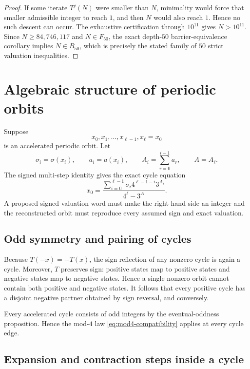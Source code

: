 \documentclass[11pt]{article}
\theoremstyle{definition}
\theoremstyle{remark}
\begin{document}
\begin{proof}
If some iterate $T^j(N)$ were smaller than $N$, minimality would force that smaller admissible integer to reach $1$, and then $N$ would also reach $1$.  Hence no such descent can occur.  The exhaustive certification through $10^{11}$ gives $N>10^{11}$.  Since $N\ge84{,}746{,}117$ and $N\in F_{50}$, the exact depth-$50$ barrier-equivalence corollary implies $N\in B_{50}$, which is precisely the stated family of $50$ strict valuation inequalities.
\end{proof}

\section{Algebraic structure of periodic orbits}

Suppose
\[
x_0,x_1,\ldots,x_{\ell-1},x_\ell=x_0
\]
is an accelerated periodic orbit.  Let
\[
\sigma_i=\sigma(x_i),
\qquad
a_i=a(x_i),
\qquad
A_i=\sum_{r=0}^{i-1}a_r,
\qquad
A=A_\ell.
\]
The signed multi-step identity gives the exact cycle equation
\begin{equation}
x_0
=
\frac{\displaystyle
\sum_{i=0}^{\ell-1}
\sigma_i4^{\ell-1-i}3^{A_i}}
{4^\ell-3^A}.
\label{eq:cycle-equation}
\end{equation}
A proposed signed valuation word must make the right-hand side an integer and the reconstructed orbit must reproduce every assumed sign and exact valuation.

\subsection{Odd symmetry and pairing of cycles}

Because $T(-x)=-T(x)$, the sign reflection of any nonzero cycle is again a cycle.  Moreover, $T$ preserves sign: positive states map to positive states and negative states map to negative states.  Hence a single nonzero orbit cannot contain both positive and negative states.  It follows that every positive cycle has a disjoint negative partner obtained by sign reversal, and conversely.

Every accelerated cycle consists of odd integers by the eventual-oddness proposition.  Hence the mod-$4$ law \eqref{eq:mod4-compatibility} applies at every cycle edge.

\subsection{Expansion and contraction steps inside a cycle}
\end{document}
